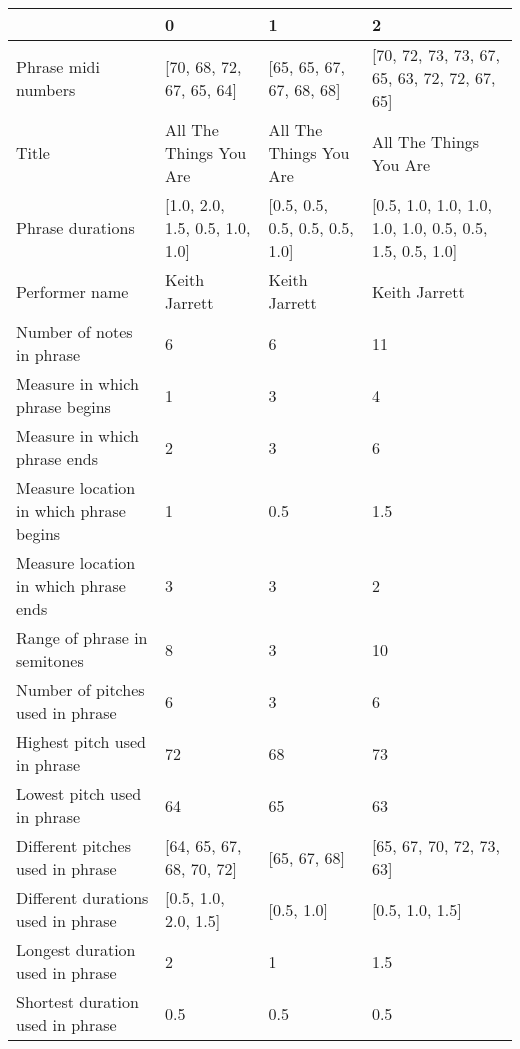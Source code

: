 \documentclass[11pt]{article}
\begin{document}
    \begin{tabular}{llll}
\toprule
{} &                                   0 &                                   1 &                                                        2 \\
\midrule
Phrase midi numbers                                           &  [70, 68, 72, 67, 65, 64] &  [65, 65, 67, 67, 68, 68] &  [70, 72, 73, 73, 67, 65, 63, 72, 72, 67, 65] \\
Title                                                         &  All The Things You Are &  All The Things You Are &  All The Things You Are \\
Phrase durations                                              &  [1.0, 2.0, 1.5, 0.5, 1.0, 1.0] &  [0.5, 0.5, 0.5, 0.5, 0.5, 1.0] &  [0.5, 1.0, 1.0, 1.0, 1.0, 1.0, 0.5, 0.5, 1.5, 0.5, 1.0] \\
Performer name                                                &  Keith Jarrett &  Keith Jarrett &  Keith Jarrett \\
Number of notes in phrase                                     &  6 &  6 &  11 \\
Measure in which phrase begins                                &  1 &  3 &  4 \\
Measure in which phrase ends                                  &  2 &  3 &  6 \\
Measure location in which phrase begins                       &  1 &  0.5 &  1.5 \\
Measure location in which phrase ends                         &  3 &  3 &  2 \\
Range of phrase in semitones                                  &  8 &  3 &  10 \\
Number of pitches used in phrase                              &  6 &  3 &  6 \\
Highest pitch used in phrase                                  &  72 &  68 &  73 \\
Lowest pitch used in phrase                                   &  64 &  65 &  63 \\
Different pitches used in phrase                              &  [64, 65, 67, 68, 70, 72] &  [65, 67, 68] &  [65, 67, 70, 72, 73, 63] \\
Different durations used in phrase                            &  [0.5, 1.0, 2.0, 1.5] &  [0.5, 1.0] &  [0.5, 1.0, 1.5] \\
Longest duration used in phrase                               &  2 &  1 &  1.5 \\
Shortest duration used in phrase                              &  0.5 &  0.5 &  0.5 \\

\end{tabular}
\end{document}
